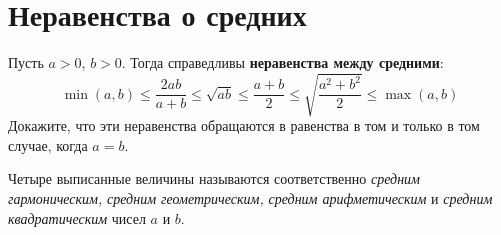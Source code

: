 

\section*{Неравенства о средних}


Пусть $a > 0$, $b > 0$.
Тогда справедливы \textbf{неравенства между средними}:
\[
    \min(a, b)
\leq
    \frac{2 a b}{a + b}
\leq
    \sqrt{ab}
\leq
    \frac{a + b}{2}
\leq
    \sqrt{\frac{a^2 + b^2}{2}}
\leq
    \max(a, b)
\]
Докажите, что эти неравенства обращаются в равенства в том и только в том
случае, когда $a = b$.

Четыре выписанные величины называются соответственно
\emph{средним гармоническим,}
\emph{средним геометрическим,}
\emph{средним арифметическим} и
\emph{средним квадратическим}
чисел $a$ и $b$.

